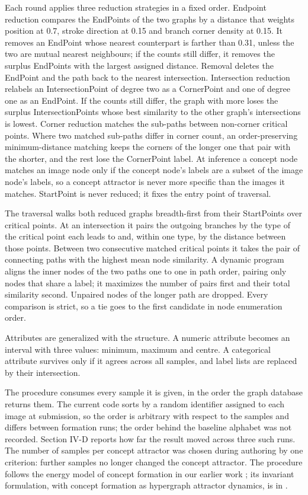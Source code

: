 Each round applies three reduction strategies in a fixed order. Endpoint reduction compares the EndPoints of the two graphs by a distance that weights position at 0.7, stroke direction at 0.15 and branch corner density at 0.15. It removes an EndPoint whose nearest counterpart is farther than 0.31, unless the two are mutual nearest neighbours; if the counts still differ, it removes the surplus EndPoints with the largest assigned distance. Removal deletes the EndPoint and the path back to the nearest intersection. Intersection reduction relabels an IntersectionPoint of degree two as a CornerPoint and one of degree one as an EndPoint. If the counts still differ, the graph with more loses the surplus IntersectionPoints whose best similarity to the other graph's intersections is lowest. Corner reduction matches the sub-paths between non-corner critical points. Where two matched sub-paths differ in corner count, an order-preserving minimum-distance matching keeps the corners of the longer one that pair with the shorter, and the rest lose the CornerPoint label. At inference a concept node matches an image node only if the concept node's labels are a subset of the image node's labels, so a concept attractor is never more specific than the images it matches. StartPoint is never reduced; it fixes the entry point of traversal.

The traversal walks both reduced graphs breadth-first from their StartPoints over critical points. At an intersection it pairs the outgoing branches by the type of the critical point each leads to and, within one type, by the distance between those points. Between two consecutive matched critical points it takes the pair of connecting paths with the highest mean node similarity. A dynamic program aligns the inner nodes of the two paths one to one in path order, pairing only nodes that share a label; it maximizes the number of pairs first and their total similarity second. Unpaired nodes of the longer path are dropped. Every comparison is strict, so a tie goes to the first candidate in node enumeration order.

Attributes are generalized with the structure. A numeric attribute becomes an interval with three values: minimum, maximum and centre. A categorical attribute survives only if it agrees across all samples, and label lists are replaced by their intersection.

The procedure consumes every sample it is given, in the order the graph database returns them. The current code sorts by a random identifier assigned to each image at submission, so the order is arbitrary with respect to the samples and differs between formation runs; the order behind the baseline alphabet was not recorded. Section IV-D reports how far the result moved across three such runs. The number of samples per concept attractor was chosen during authoring by one criterion: further samples no longer changed the concept attractor. The procedure follows the energy model of concept formation in our earlier work \cite{parzhyn2025energy}; its invariant formulation, with concept formation as hypergraph attractor dynamics, is in \cite{lapin2026invariant}.


